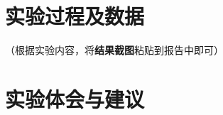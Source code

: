 \documentclass{sasreport}
\begin{document}
\maketitle

\section{实验过程及数据}

（根据实验内容，将\textbf{结果截图}粘贴到报告中即可）

\section{实验体会与建议}
\end{document}
